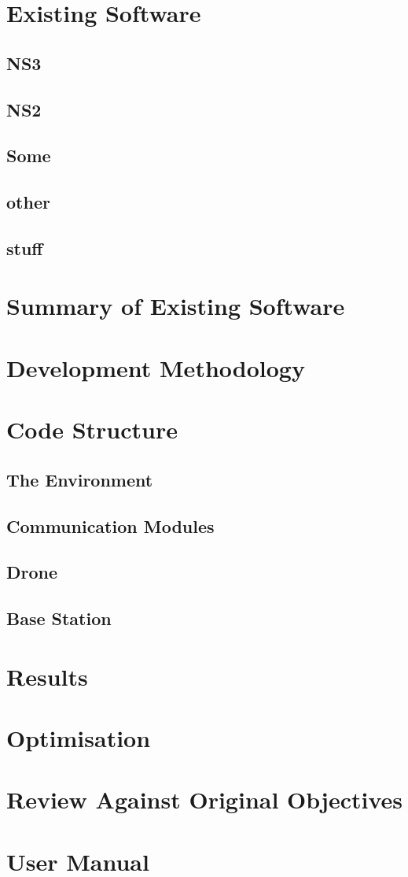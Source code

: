 \section{Existing Software}
	\subsection{NS3}
	\subsection{NS2}
	\subsection{Some}
	\subsection{other}
	\subsection{stuff}
\section{Summary of Existing Software}
\section{Development Methodology}
\section{Code Structure}


	\subsection{The Environment}
	\subsection{Communication Modules}
	\subsection{Drone}
	\subsection{Base Station}
\section{Results}
\section{Optimisation}
\section{Review Against Original Objectives}
\section{User Manual}